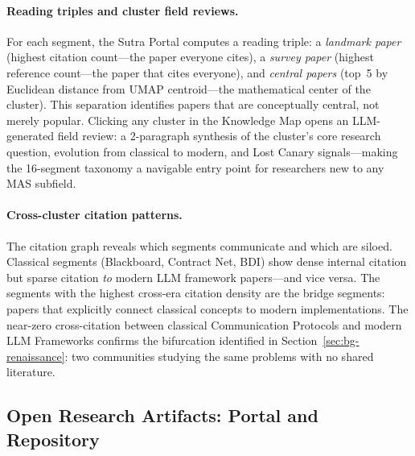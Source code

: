 \documentclass{article}
\begin{document}
\paragraph{Reading triples and cluster field reviews.}
For each segment, the Sutra Portal computes a reading triple: a \emph{landmark paper}
(highest citation count---the paper everyone cites), a \emph{survey paper} (highest
reference count---the paper that cites everyone), and \emph{central papers} (top~5 by
Euclidean distance from UMAP centroid---the mathematical center of the cluster). This
separation identifies papers that are conceptually central, not merely popular.
Clicking any cluster in the Knowledge Map opens an LLM-generated field review: a
2-paragraph synthesis of the cluster's core research question, evolution from classical
to modern, and Lost Canary signals---making the 16-segment taxonomy a navigable entry
point for researchers new to any MAS subfield.

\paragraph{Cross-cluster citation patterns.}
The citation graph reveals which segments communicate and which are siloed. Classical
segments (Blackboard, Contract Net, BDI) show dense internal citation but sparse
citation \emph{to} modern LLM framework papers---and vice versa. The segments with
the highest cross-era citation density are the bridge segments: papers that explicitly
connect classical concepts to modern implementations. The near-zero cross-citation
between classical Communication Protocols and modern LLM Frameworks confirms the
bifurcation identified in Section~\ref{sec:bg-renaissance}: two communities studying
the same problems with no shared literature.

\subsection{Open Research Artifacts: Portal and Repository}
\label{sec:res-artifacts}
\end{document}
